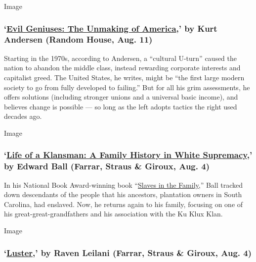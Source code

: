 Image

\hypertarget{evil-geniuses-the-unmaking-of-america-by-kurt-andersen-random-house-aug-11}{%
\subsubsection{\texorpdfstring{`\href{https://www.penguinrandomhouse.com/books/594493/evil-geniuses-by-kurt-andersen/}{Evil
Geniuses: The Unmaking of America},' by Kurt Andersen (Random House,
Aug.
11)}{`Evil Geniuses: The Unmaking of America,' by Kurt Andersen (Random House, Aug. 11)}}\label{evil-geniuses-the-unmaking-of-america-by-kurt-andersen-random-house-aug-11}}

Starting in the 1970s, according to Andersen, a ``cultural U-turn''
caused the nation to abandon the middle class, instead rewarding
corporate interests and capitalist greed. The United States, he writes,
might be ``the first large modern society to go from fully developed to
failing.'' But for all his grim assessments, he offers solutions
(including stronger unions and a universal basic income), and believes
change is possible --- so long as the left adopts tactics the right used
decades ago.

Image

\hypertarget{life-of-a-klansman-a-family-history-in-white-supremacy-by-edward-ball-farrar-straus--giroux-aug-4}{%
\subsubsection{\texorpdfstring{`\href{https://us.macmillan.com/books/9780374186326}{Life
of a Klansman: A Family History in White Supremacy},' by Edward Ball
(Farrar, Straus \& Giroux, Aug.
4)}{`Life of a Klansman: A Family History in White Supremacy,' by Edward Ball (Farrar, Straus \& Giroux, Aug. 4)}}\label{life-of-a-klansman-a-family-history-in-white-supremacy-by-edward-ball-farrar-straus--giroux-aug-4}}

In his National Book Award-winning book
``\href{https://archive.nytimes.com/www.nytimes.com/books/98/03/01/reviews/980301.01faustt.html}{Slaves
in the Family},'' Ball tracked down descendants of the people that his
ancestors, plantation owners in South Carolina, had enslaved. Now, he
returns again to his family, focusing on one of his
great-great-grandfathers and his association with the Ku Klux Klan.

Image

\hypertarget{luster-by-raven-leilani-farrar-straus--giroux-aug-4}{%
\subsubsection{\texorpdfstring{`\href{https://us.macmillan.com/books/9780374910334}{Luster},'
by Raven Leilani (Farrar, Straus \& Giroux, Aug.
4)}{`Luster,' by Raven Leilani (Farrar, Straus \& Giroux, Aug. 4)}}\label{luster-by-raven-leilani-farrar-straus--giroux-aug-4}}

